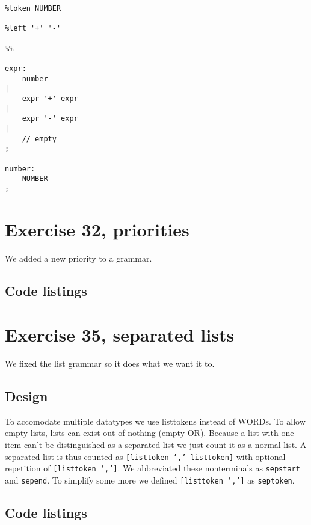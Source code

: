 \documentclass[11pt]{article}
\begin{document}
\begin{lstlisting}
%token NUMBER

%left '+' '-'

%%

expr:
    number
|
    expr '+' expr
|
    expr '-' expr
|
	// empty
;

number:
    NUMBER
;
\end{lstlisting}

\section*{Exercise 32, priorities}
We added a new priority to a grammar.

\subsection*{Code listings}


\section*{Exercise 35, separated lists}
We fixed the list grammar so it does what we want it to.

\subsection*{Design}
To accomodate multiple datatypes we use listtokens instead of WORDs.
To allow empty lists, lists can exist out of nothing (empty OR).
Because a list with one item can't be distinguished as a separated list we just count it as a normal list.
A separated list is thus counted as \texttt{[listtoken ',' listtoken]} with optional repetition of \texttt{[listtoken ',']}.
We abbreviated these nonterminals as \texttt{sepstart} and \texttt{sepend}.
To simplify some more we defined \texttt{[listtoken ',']} as \texttt{septoken}.

\subsection*{Code listings}

\end{document}
